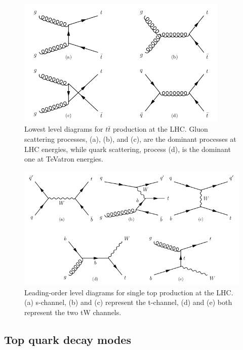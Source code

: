 \begin{figure} 
\begin{center}
\includegraphics[width=0.9\textwidth]{Figures/ttbarProductionLHC.png}
\end{center}
\caption{Lowest level diagrams for $t\bar{t}$ production at the LHC. Gluon scattering processes, {(a)}, {(b)}, and {(c)}, are the dominant processes at LHC energies, while quark scattering, process {(d)}, is the dominant one at TeVatron energies. \cite{SergeyThesis}}
\label{fig-ttbarProductionLHC}
\end{figure}

\begin{figure} 
\begin{center}
\includegraphics[width=\textwidth]{Figures/singletopProductionLHC.png}
\end{center}
\caption{Leading-order level diagrams for single top production at the LHC. {(a)} s-channel, {(b)} and {(c)} represent the t-channel, {(d)} and {(e)} both represent the two tW channels. \cite{SergeyThesis}}
\label{fig-singletopProductionLHC}
\end{figure}

\subsection{Top quark decay modes} \label{subsec-TopDecayModes}

